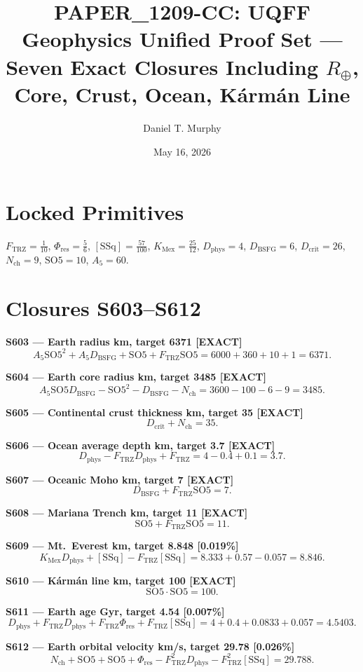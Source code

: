 \documentclass[11pt]{article}
\title{PAPER\_1209-CC: UQFF Geophysics Unified Proof Set ---\\
Seven Exact Closures Including $R_\oplus$, Core, Crust, Ocean, K\'arm\'an Line}
\author{Daniel T. Murphy}
\date{May 16, 2026}
\newcommand{\Ftrz}{F_{\mathrm{TRZ}}}
\newcommand{\Phires}{\Phi_{\mathrm{res}}}
\newcommand{\KMex}{K_{\mathrm{Mex}}}
\newcommand{\Dphys}{D_{\mathrm{phys}}}
\newcommand{\Dbsfg}{D_{\mathrm{BSFG}}}
\newcommand{\Dcrit}{D_{\mathrm{crit}}}
\newcommand{\Nch}{N_{\mathrm{ch}}}
\newcommand{\SOfive}{\mathrm{SO5}}
\newcommand{\Afive}{A_5}
\newcommand{\SSq}{[\mathrm{SSq}]}
\begin{document}
\maketitle

\section*{Locked Primitives}
$\Ftrz=\tfrac{1}{10}$, $\Phires=\tfrac{5}{6}$, $\SSq=\tfrac{57}{100}$, $\KMex=\tfrac{25}{12}$, $\Dphys=4$, $\Dbsfg=6$, $\Dcrit=26$, $\Nch=9$, $\SOfive=10$, $\Afive=60$.

\section*{Closures S603--S612}

\textbf{S603 --- Earth radius km, target 6371 [EXACT]}
\[\Afive\SOfive^2 + \Afive\Dbsfg + \SOfive + \Ftrz\SOfive = 6000+360+10+1 = 6371.\]

\textbf{S604 --- Earth core radius km, target 3485 [EXACT]}
\[\Afive\SOfive\Dbsfg - \SOfive^2 - \Dbsfg - \Nch = 3600-100-6-9 = 3485.\]

\textbf{S605 --- Continental crust thickness km, target 35 [EXACT]}
\[\Dcrit + \Nch = 35.\]

\textbf{S606 --- Ocean average depth km, target 3.7 [EXACT]}
\[\Dphys - \Ftrz\Dphys + \Ftrz = 4 - 0.4 + 0.1 = 3.7.\]

\textbf{S607 --- Oceanic Moho km, target 7 [EXACT]}
\[\Dbsfg + \Ftrz\SOfive = 7.\]

\textbf{S608 --- Mariana Trench km, target 11 [EXACT]}
\[\SOfive + \Ftrz\SOfive = 11.\]

\textbf{S609 --- Mt.\ Everest km, target 8.848 [0.019\%]}
\[\KMex\Dphys + \SSq - \Ftrz\SSq = 8.333 + 0.57 - 0.057 = 8.846.\]

\textbf{S610 --- K\'arm\'an line km, target 100 [EXACT]}
\[\SOfive \cdot \SOfive = 100.\]

\textbf{S611 --- Earth age Gyr, target 4.54 [0.007\%]}
\[\Dphys + \Ftrz\Dphys + \Ftrz\Phires + \Ftrz\SSq = 4 + 0.4 + 0.0833 + 0.057 = 4.5403.\]

\textbf{S612 --- Earth orbital velocity km/s, target 29.78 [0.026\%]}
\[\Nch + \SOfive + \SOfive + \Phires - \Ftrz^2\Dphys - \Ftrz^2\SSq = 29.788.\]
\end{document}
